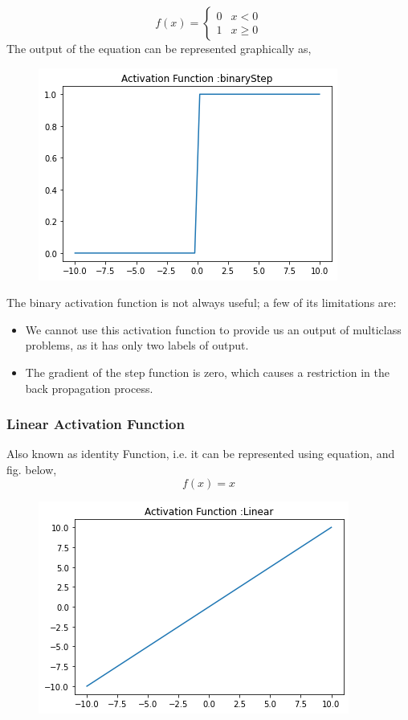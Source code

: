 \begin{equation} \label{eq:2}
   f(x) =  \begin{cases} 
      0 & x < 0 \\
      1 &  x \geq 0 
   \end{cases}
\end{equation}
The output of the equation can be represented graphically as,
\begin{figure}[H]
    \centering
    \includegraphics[scale=0.5]{Figure/binary.png}
    \label{fig:my_label}
\end{figure}
The binary activation function is not always useful; a few of its limitations are:
\begin{itemize}
    \item We cannot use this activation function to provide us an output of multiclass problems, as it has only two labels of output.
    \item The gradient of the step function is zero, which causes a restriction in the back propagation process.
\end{itemize}

 
\subsubsection{Linear Activation Function}
Also known as identity Function, i.e. it can be represented using equation, and fig. below,
\begin{equation}
    f(x) = x
\end{equation}

\begin{figure}[H]
    \centering
    \includegraphics[scale=0.6]{Figure/linear.png}
    \label{fig:my_label_02wwe}
\end{figure}

